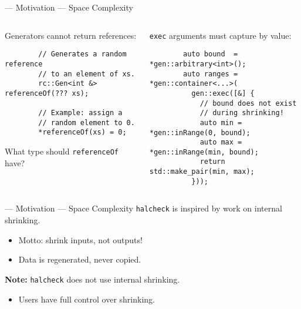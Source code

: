 \begin{frame}[fragile]{\halcheck{} --- Motivation --- Space Complexity}
  \begin{columns}[t]
    \begin{block}{Generators cannot return references:}
      \begin{verbatim}
        // Generates a random reference
        // to an element of xs.
        rc::Gen<int &> referenceOf(??? xs);

        // Example: assign a
        // random element to 0.
        *referenceOf(xs) = 0;
      \end{verbatim}

      What type should \texttt{referenceOf} have?
    \end{block}

    \pause{}

    \begin{block}{\texttt{exec} arguments must capture by value:}
      \begin{verbatim}
        auto bound  = *gen::arbitrary<int>();
        auto ranges = *gen::container<...>(
          gen::exec([&] {
            // bound does not exist
            // during shrinking!
            auto min = *gen::inRange(0, bound);
            auto max = *gen::inRange(min, bound);
            return std::make_pair(min, max);
          }));
      \end{verbatim}
    \end{block}
  \end{columns}
\end{frame}

\begin{frame}{\halcheck{} --- Motivation --- Space Complexity}
  \texttt{halcheck} is inspired by work on \alert{internal shrinking}.
  \begin{itemize}
    \item Motto: shrink inputs, not outputs!
    \item Data is regenerated, never copied.
  \end{itemize}

  \textbf{Note:} \texttt{halcheck} does \alert{not} use internal shrinking.
  \begin{itemize}
    \item Users have full control over shrinking.
  \end{itemize}
\end{frame}

